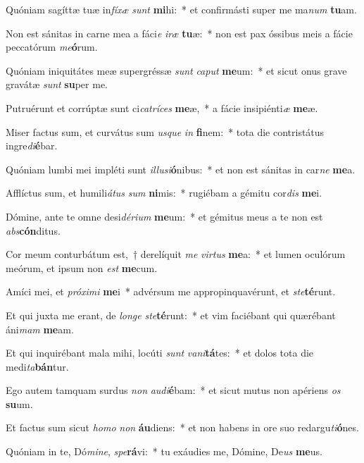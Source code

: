 \item Quóniam sagíttæ tuæ in\textit{fí}\textit{xæ} \textit{sunt} \textbf{mi}hi:~* et confirmásti super me ma\textit{num} \textbf{tu}am.
\item Non est sánitas in carne mea a fáci\textit{e} \textit{i}\textit{ræ} \textbf{tu}æ:~* non est pax óssibus meis a fácie peccatórum \textit{me}\textbf{ó}rum.
\item Quóniam iniquitátes meæ supergréssæ \textit{sunt} \textit{ca}\textit{put} \textbf{me}um:~* et sicut onus grave gravátæ \textit{sunt} \textbf{su}per me.
\item Putruérunt et corrúptæ sunt ci\textit{ca}\textit{trí}\textit{ces} \textbf{me}æ,~* a fácie insipiénti\textit{æ} \textbf{me}æ.
\item Miser factus sum, et curvátus sum \textit{us}\textit{que} \textit{in} \textbf{fi}nem:~* tota die contristátus ingre\textit{di}\textbf{é}bar.
\item Quóniam lumbi mei impléti sunt \textit{il}\textit{lu}\textit{si}\textbf{ó}nibus:~* et non est sánitas in car\textit{ne} \textbf{me}a.
\item Afflíctus sum, et humili\textit{á}\textit{tus} \textit{sum} \textbf{ni}mis:~* rugiébam a gémitu cor\textit{dis} \textbf{me}i.
\item Dómine, ante te omne desi\textit{dé}\textit{ri}\textit{um} \textbf{me}um:~* et gémitus meus a te non est \textit{abs}\textbf{cón}ditus.
\item Cor meum conturbátum est,~† derelíquit \textit{me} \textit{vir}\textit{tus} \textbf{me}a:~* et lumen oculórum meórum, et ipsum non \textit{est} \textbf{me}cum.
\item Amíci mei, et \textit{pró}\textit{xi}\textit{mi} \textbf{me}i~* advérsum me appropinquavérunt, et \textit{ste}\textbf{té}runt.
\item Et qui juxta me erant, de \textit{lon}\textit{ge} \textit{ste}\textbf{té}runt:~* et vim faciébant qui quærébant áni\textit{mam} \textbf{me}am.
\item Et qui inquirébant mala mihi, locúti \textit{sunt} \textit{va}\textit{ni}\textbf{tá}tes:~* et dolos tota die medi\textit{ta}\textbf{bán}tur.
\item Ego autem tamquam surdus \textit{non} \textit{au}\textit{di}\textbf{é}bam:~* et sicut mutus non apériens \textit{os} \textbf{su}um.
\item Et factus sum sicut \textit{ho}\textit{mo} \textit{non} \textbf{áu}diens:~* et non habens in ore suo redargu\textit{ti}\textbf{ó}nes.
\item Quóniam in te, Dó\textit{mi}\textit{ne}, \textit{spe}\textbf{rá}vi:~* tu exáudies me, Dómine, De\textit{us} \textbf{me}us.
